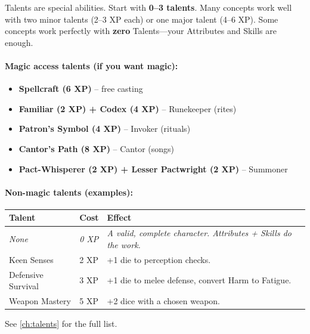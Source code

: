 Talents are special abilities. Start with \textbf{0--3 talents}. Many concepts work well with two minor talents (2--3 XP each) or one major talent (4--6 XP). Some concepts work perfectly with \textbf{zero} Talents---your Attributes and Skills are enough.

\paragraph{Magic access talents (if you want magic):}
\begin{itemize}
  \item \textbf{Spellcraft (6 XP)} -- free casting
  \item \textbf{Familiar (2 XP) + Codex (4 XP)} -- Runekeeper (rites)
  \item \textbf{Patron's Symbol (4 XP)} -- Invoker (rituals)
  \item \textbf{Cantor's Path (8 XP)} -- Cantor (songs)
  \item \textbf{Pact-Whisperer (2 XP) + Lesser Pactwright (2 XP)} -- Summoner
\end{itemize}

\paragraph{Non-magic talents (examples):}
\begin{center}
\begin{tabular}{lll}
\toprule
\textbf{Talent} & \textbf{Cost} & \textbf{Effect} \\
\midrule
\textit{None} & \textit{0 XP} & \textit{A valid, complete character. Attributes + Skills do the work.} \\
Keen Senses & 2 XP & +1 die to perception checks. \\
Defensive Survival & 3 XP & +1 die to melee defense, convert Harm to Fatigue. \\
Weapon Mastery & 5 XP & +2 dice with a chosen weapon. \\
\bottomrule
\end{tabular}
\end{center}

See \ref{ch:talents} for the full list.

